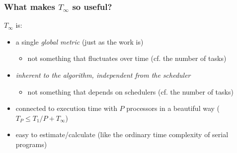\documentclass[12pt,dvipdfmx]{beamer}
\newcommand{\ao}[1]{{\color{blue}#1}}
\begin{document}
\begin{frame}
\frametitle{What makes $T_\infty$ so useful?}
$T_\infty$ is:
\begin{itemize}
\item a single \ao{\em global metric} (just as the work is)
  \begin{itemize}
  \item not something that fluctuates over time
    (cf. the number of tasks)
  \end{itemize}

\item \ao{\em inherent to the algorithm,
    independent from the scheduler}
  \begin{itemize}
  \item not something that depends on schedulers
    (cf. the number of tasks)
  \end{itemize}

\item connected to execution time with $P$
  processors in a beautiful way (\ao{$T_P \leq T_1/P
  + T_\infty$})

\item \ao{easy to estimate/calculate}
  (like the ordinary time complexity of serial programs)
\end{itemize}

\end{frame}

\end{document}
